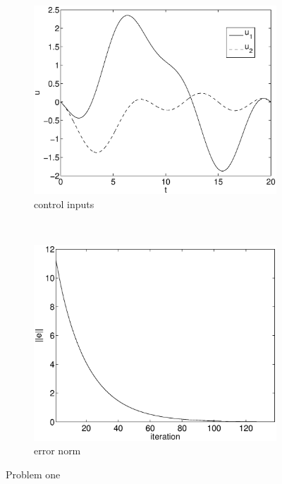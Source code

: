 \begin{figure}[h]
\begin{subfigure}[b]{0.45\textwidth}
\centering
\includegraphics[width=\textwidth]{img/manip_task_u.eps}
\caption{control inputs}
\end{subfigure}
~
\begin{subfigure}[b]{0.45\textwidth}
\centering
\includegraphics[width=\textwidth]{img/manip_task_err.eps}
\caption{error norm}
\end{subfigure}
\caption{Problem one}
\label{fig:pr1}
\end{figure}

